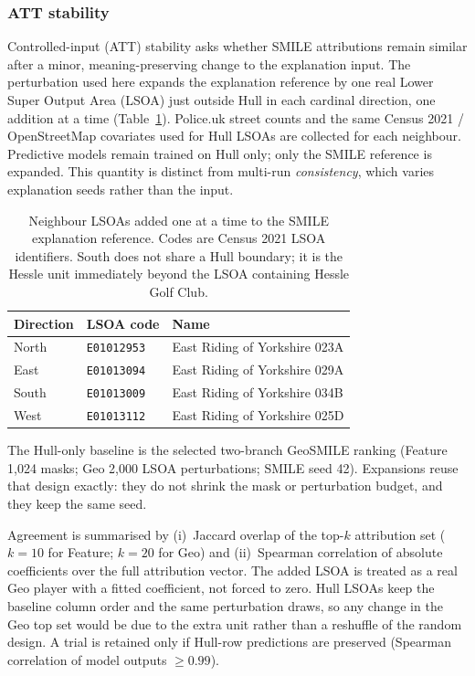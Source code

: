 \subsubsection{ATT stability}
\label{sec:hull_att_stability}

Controlled-input (ATT) stability asks whether SMILE attributions remain similar after a minor, meaning-preserving change to the explanation input. The perturbation used here expands the explanation reference by one real Lower Super Output Area (LSOA) just outside Hull in each cardinal direction, one addition at a time (Table~\ref{tab:hull_att_stability_neighbors}). Police.uk street counts and the same Census 2021 / OpenStreetMap covariates used for Hull LSOAs are collected for each neighbour. Predictive models remain trained on Hull only; only the SMILE reference is expanded. This quantity is distinct from multi-run \emph{consistency}, which varies explanation seeds rather than the input.

\begin{table}[H]
\centering
\caption{Neighbour LSOAs added one at a time to the SMILE explanation reference.
Codes are Census 2021 LSOA identifiers.
South does not share a Hull boundary; it is the Hessle unit immediately beyond the LSOA containing Hessle Golf Club.}
\label{tab:hull_att_stability_neighbors}
\begin{tabular}{lll}
\toprule
Direction & LSOA code & Name \\
\midrule
North & \texttt{E01012953} & East Riding of Yorkshire 023A \\
East  & \texttt{E01013094} & East Riding of Yorkshire 029A \\
South & \texttt{E01013009} & East Riding of Yorkshire 034B \\
West  & \texttt{E01013112} & East Riding of Yorkshire 025D \\
\bottomrule
\end{tabular}
\end{table}

The Hull-only baseline is the selected two-branch GeoSMILE ranking (Feature 1,024 masks; Geo 2,000 LSOA perturbations; SMILE seed 42). Expansions reuse that design exactly: they do not shrink the mask or perturbation budget, and they keep the same seed.

Agreement is summarised by (i)~Jaccard overlap of the top-$k$ attribution set ($k=10$ for Feature; $k=20$ for Geo) and (ii)~Spearman correlation of absolute coefficients over the full attribution vector. The added LSOA is treated as a real Geo player with a fitted coefficient, not forced to zero. Hull LSOAs keep the baseline column order and the same perturbation draws, so any change in the Geo top set would be due to the extra unit rather than a reshuffle of the random design. A trial is retained only if Hull-row predictions are preserved (Spearman correlation of model outputs $\ge 0.99$).

